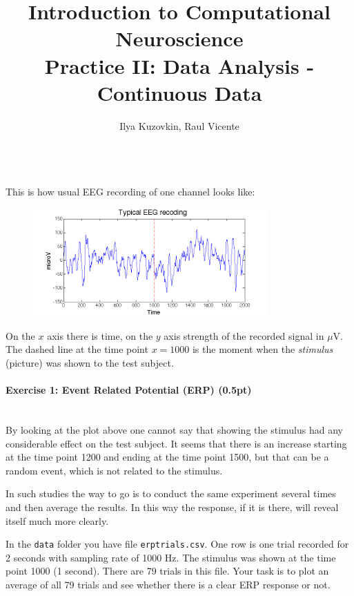\documentclass[a4paper,11pt]{article}
\author{\large{Ilya Kuzovkin, Raul Vicente}}
\title{\huge{Introduction to Computational Neuroscience}\\\LARGE{Practice II: Data Analysis - Continuous Data}}
\newenvironment{exercise}[3]{\paragraph{Exercise #1: #2 (#3pt)}\ \\}{
\medskip}
\begin{document}
\maketitle
\ \\
This is how usual EEG recording of one channel looks like:
\begin{figure}[H]
   \centering
   \includegraphics[width=0.8\textwidth]{eegrecording.png} 
\end{figure}
On the $x$ axis there is time, on the $y$ axis strength of the recorded signal in $\mu$V. The dashed line at the time point $x=1000$ is the moment when the \emph{stimulus} (picture) was shown to the test subject.

%
%
\begin{exercise}{1}{Event Related Potential (ERP)}{0.5}
By looking at the plot above one cannot say that showing the stimulus had any considerable effect on the test subject. It seems that there is an increase starting at the time point 1200 and ending at the time point 1500, but that can be a random event, which is not related to the stimulus.

In such studies the way to go is to conduct the same experiment several times and then average the results. In this way the response, if it is there, will reveal itself much more clearly.

In the \texttt{data} folder you have file \texttt{erptrials.csv}. One row is one trial recorded for 2 seconds with sampling rate of 1000 Hz. The stimulus was shown at the time point 1000 (1 second). There are 79 trials in this file. Your task is to plot an average of all 79 trials and see whether there is a clear ERP response or not.
\end{exercise}
\end{document}
